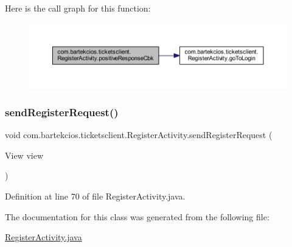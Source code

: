 Here is the call graph for this function\+:\nopagebreak
\begin{figure}[H]
\begin{center}
\leavevmode
\includegraphics[width=350pt]{classcom_1_1bartekcios_1_1ticketsclient_1_1_register_activity_ac6ff244e4175ca87432b78be7c507d66_cgraph}
\end{center}
\end{figure}
\mbox{\label{classcom_1_1bartekcios_1_1ticketsclient_1_1_register_activity_a3cb03995bb1c04e245507d87269d19a3}} 
\subsubsection{\texorpdfstring{send\+Register\+Request()}{sendRegisterRequest()}}
{\footnotesize\ttfamily void com.\+bartekcios.\+ticketsclient.\+Register\+Activity.\+send\+Register\+Request (\begin{DoxyParamCaption}\item[{View}]{view }\end{DoxyParamCaption})}



Definition at line 70 of file Register\+Activity.\+java.



The documentation for this class was generated from the following file\+:\begin{DoxyCompactItemize}
\item 
\hyperlink{_register_activity_8java}{Register\+Activity.\+java}\end{DoxyCompactItemize}
